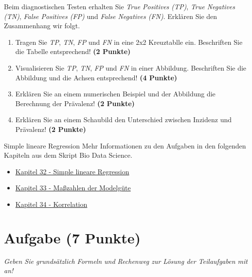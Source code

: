 \documentclass[a4paper, 10pt]{scrartcl}\usepackage[]{graphicx}\usepackage[]{xcolor}
\begin{document}
Beim diagnostischen Testen erhalten Sie \textit{True Positives (TP)},
\textit{True Negatives (TN)}, \textit{False Positives (FP)} und
\textit{False Negatives (FN)}. Erkl{\"a}ren Sie den Zusammenhang wir folgt.

\begin{enumerate}
\item Tragen Sie \textit{TP}, \textit{TN}, \textit{FP} und \textit{FN} in
  eine 2x2 Kreuztablle ein. Beschriften Sie die Tabelle entsprechend!
  \textbf{(2 Punkte)}
\item Visualisieren Sie \textit{TP}, \textit{TN}, \textit{FP} und
  \textit{FN} in einer Abbildung. Beschriften Sie die Abbildung und die
  Achsen entsprechend! \textbf{(4 Punkte)}
\item Erkl{\"a}ren Sie an einem numerischen Beispiel und der Abbildung die
  Berechnung der Pr{\"a}valenz!  \textbf{(2 Punkte)}
\item Erkl{\"a}ren Sie an einem Schaubild den Unterschied zwischen Inzidenz und
  Pr{\"a}valenz!  \textbf{(2 Punkte)}
\end{enumerate}





 
\clearpage
\begin{graybox}{Simple lineare Regression}
Mehr Informationen zu den Aufgaben in den folgenden Kapiteln aus dem Skript Bio Data Science.
  \begin{itemize}
  \item \href{https://jkruppa.github.io/stat-linear-reg-basic.html}{Kapitel 32 - Simple lineare Regression}
  \item \href{https://jkruppa.github.io/stat-linear-reg-quality.html}{Kapitel 33 - Ma{\ss}zahlen der Modelg{\"u}te}
  \item \href{https://jkruppa.github.io/stat-linear-reg-corr.html}{Kapitel 34 - Korrelation}
  \end{itemize}
\end{graybox}
\clearpage

\section{Aufgabe \hfill (7 Punkte)}

\textit{Geben Sie grunds{\"a}tzlich Formeln und Rechenweg zur L{\"o}sung der
  Teilaufgaben mit an!} \\[1Ex]
\end{document}
